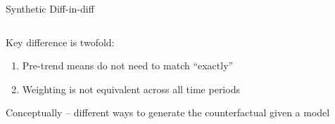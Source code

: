 \documentclass[notes,11pt, aspectratio=169]{beamer}
\newenvironment{wideitemize}{\itemize\addtolength{\itemsep}{10pt}}{\enditemize}
\begin{document}
\begin{frame}{Synthetic Diff-in-diff}
  \begin{columns}[T] %
    \begin{column}{0.5\textwidth}
  \begin{wideitemize}
  \item Key difference is twofold:
    \begin{enumerate}
    \item Pre-trend means do not need to match ``exactly''
    \item Weighting is not equivalent across all time periods
    \end{enumerate}
  \item Conceptually -- different ways to generate the counterfactual given a model 
  \end{wideitemize}
\end{column}
\begin{column}{0.5\textwidth}
\end{column}
\end{columns}
\end{frame}
\end{document}
